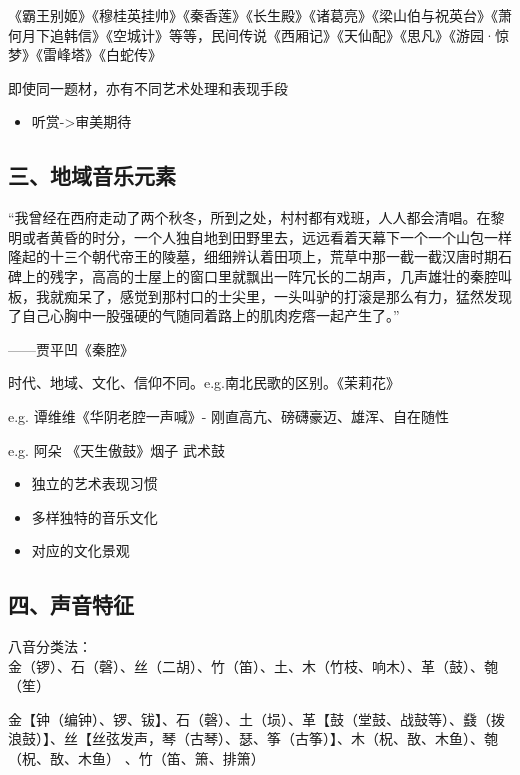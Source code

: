 \documentclass[
]{article}
\providecommand{\tightlist}{%
  \setlength{\itemsep}{0pt}\setlength{\parskip}{0pt}}
\begin{document}
《霸王别姬》《穆桂英挂帅》《秦香莲》《长生殿》《诸葛亮》《梁山伯与祝英台》《萧何月下追韩信》《空城计》等等，民间传说《西厢记》《天仙配》《思凡》《游园·惊梦》《雷峰塔》《白蛇传》

即使同一题材，亦有不同艺术处理和表现手段

\begin{itemize}
\tightlist
\item
  听赏-\textgreater 审美期待
\end{itemize}

\subsection{三、地域音乐元素}\label{ux4e09ux5730ux57dfux97f3ux4e50ux5143ux7d20}

``我曾经在西府走动了两个秋冬，所到之处，村村都有戏班，人人都会清唱。在黎明或者黄昏的时分，一个人独自地到田野里去，远远看着天幕下一个一个山包一样隆起的十三个朝代帝王的陵墓，细细辨认着田项上，荒草中那一截一截汉唐时期石碑上的残字，高高的士屋上的窗口里就飘出一阵冗长的二胡声，几声雄壮的秦腔叫板，我就痴呆了，感觉到那村口的士尖里，一头叫驴的打滚是那么有力，猛然发现了自己心胸中一股强硬的气随同着路上的肌肉疙瘩一起产生了。''

------贾平凹《秦腔》

时代、地域、文化、信仰不同。e.g.南北民歌的区别。《茉莉花》

e.g. 谭维维《华阴老腔一声喊》- 刚直高亢、磅礴豪迈、雄浑、自在随性

e.g. 阿朵 《天生傲鼓》烟子 武术鼓

\begin{itemize}
\tightlist
\item
  独立的艺术表现习惯
\item
  多样独特的音乐文化
\item
  对应的文化景观
\end{itemize}

\subsection{四、声音特征}\label{ux56dbux58f0ux97f3ux7279ux5f81}

八音分类法：\\
金（锣）、石（磬）、丝（二胡）、竹（笛）、土、木（竹枝、响木）、革（鼓）、匏（笙）

金【钟（编钟）、锣、钹】、石（磬）、土（埙）、革【鼓（堂鼓、战鼓等）、鼗（拨浪鼓）】、丝【丝弦发声，琴（古琴）、瑟、筝（古筝）】、木（柷、敔、木鱼）、匏（柷、敔、木鱼）
、竹（笛、箫、排箫）
\end{document}

